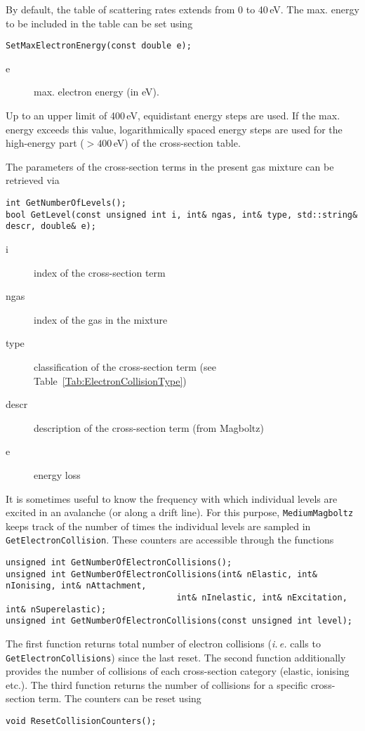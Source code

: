 By default, the table of scattering rates extends from 0 to 40\,eV. 
The max. energy to be included in the table can be set using
\begin{lstlisting}
SetMaxElectronEnergy(const double e);
\end{lstlisting}
\begin{description}
\item[e]
  max. electron energy (in eV).
\end{description}
Up to an upper limit of 400\,eV, equidistant energy steps are used.
If the max. energy exceeds this value, logarithmically spaced 
energy steps are used for the high-energy part ($>400$\,eV) 
of the cross-section table.

The parameters of the cross-section terms in the present gas mixture 
can be retrieved via
\begin{lstlisting}
int GetNumberOfLevels();
bool GetLevel(const unsigned int i, int& ngas, int& type, std::string& descr, double& e);
\end{lstlisting}
\begin{description}
  \item[i] index of the cross-section term
  \item[ngas] index of the gas in the mixture
  \item[type] classification of the cross-section term 
              (see Table~\ref{Tab:ElectronCollisionType})
  \item[descr] description of the cross-section term (from Magboltz)
  \item[e] energy loss
\end{description}

It is sometimes useful to know the frequency with which individual levels 
are excited in an avalanche (or along a drift line). 
For this purpose, \texttt{MediumMagboltz} keeps track of the number of times 
the individual levels are sampled in \texttt{GetElectronCollision}. 
These counters are accessible through the functions
\begin{lstlisting}
unsigned int GetNumberOfElectronCollisions();
unsigned int GetNumberOfElectronCollisions(int& nElastic, int& nIonising, int& nAttachment,
                                  int& nInelastic, int& nExcitation, int& nSuperelastic);
unsigned int GetNumberOfElectronCollisions(const unsigned int level);
\end{lstlisting}
The first function returns total number of electron collisions (\textit{i.\,e.} calls 
to \texttt{GetElectronCollisions}) since the last reset. 
The second function additionally provides the number of collisions of each 
cross-section category (elastic, ionising etc.). 
The third function returns the number of collisions for a specific cross-section term.
The counters can be reset using
\begin{lstlisting}
void ResetCollisionCounters();
\end{lstlisting} 

